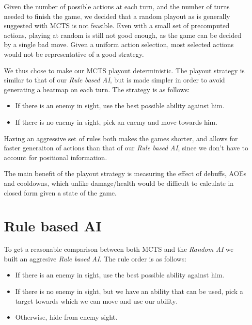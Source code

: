 Given the number of possible actions at each turn, and the number of turns needed to finish
the game, we decided that a random playout as is generally suggested with MCTS is not feasible.
Even with a small set of precomputed actions, playing at random is still not good enough,
as the game can be decided by a single bad move. Given a uniform action selection, most selected
actions would not be representative of a good strategy.

We thus chose to make our MCTS playout deterministic. The playout strategy
is similar to that of our \emph{Rule based AI}, but is made simpler in order
to avoid generating a heatmap on each turn. The strategy is as follows:

\begin{itemize}[align=right,labelwidth=3cm]
\item If there is an enemy in sight, use the best possible ability against him.
\item If there is no enemy in sight, pick an enemy and move towards him.
\end{itemize}

Having an aggressive set of rules both makes the games shorter, and allows for faster
generaiton of actions than that of our \emph{Rule based AI}, since we don't have to account
for positional information.

The main benefit of the playout strategy is measuring the effect of debuffs, AOEs and cooldowns,
which unlike damage/health would be difficult to calculate in closed form given a state of the game.



\section{Rule based AI}

To get a reasonable comparison between both MCTS and the \emph{Random AI} we built
an aggresive \emph{Rule based AI}. The rule order is as follows:

\begin{itemize}[align=right,labelwidth=3cm]
\item If there is an enemy in sight, use the best possible ability against him.
\item If there is no enemy in sight, but we have an ability that can be used, pick a target towards which we can move and use our ability.
\item Otherwise, hide from enemy sight.
\end{itemize}


